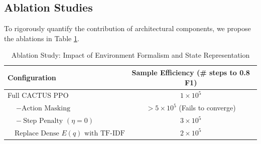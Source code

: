 \documentclass{article}
\begin{document}
\subsection{Ablation Studies}
To rigorously quantify the contribution of architectural components, we propose the ablations in Table \ref{tab:ablation}.

\begin{table}[h]
\centering
\caption{Ablation Study: Impact of Environment Formalism and State Representation}
\label{tab:ablation}
\begin{tabular}{lc}
\toprule
\textbf{Configuration} & \textbf{Sample Efficiency} (\# steps to 0.8 F1) \\
\midrule
Full CACTUS PPO & $1 \times 10^5$ \\
$\quad - \text{Action Masking}$ & $> 5 \times 10^5$ (Fails to converge) \\
$\quad - \text{Step Penalty } (\eta = 0)$ & $3 \times 10^5$ \\
$\quad \text{Replace Dense } E(q) \text{ with TF-IDF}$ & $2 \times 10^5$ \\
\bottomrule
\end{tabular}
\end{table}
\end{document}
